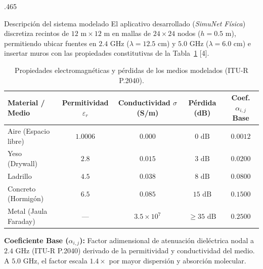 \documentclass[final]{beamer}
\begin{document}
\begin{frame}[t]
\begin{columns}[t]
\begin{column}{.465\paperwidth}
				\begin{block}{Descripción del sistema modelado}
					El aplicativo desarrollado (\textit{SimuNet Física}) discretiza recintos de \(12\text{ m} \times 12\text{ m}\) en mallas de \(24 \times 24\) nodos (\(h = 0.5\text{ m}\)), permitiendo ubicar fuentes en \(2.4\text{ GHz}\) (\(\lambda = 12.5\text{ cm}\)) y \(5.0\text{ GHz}\) (\(\lambda = 6.0\text{ cm}\)) e insertar muros con las propiedades constitutivas de la Tabla~\ref{tab:materiales} [4].
					
					\begin{table}
						\centering
						\caption{Propiedades electromagnéticas y pérdidas de los medios modelados (ITU-R P.2040).}
						\label{tab:materiales}
						\fontsize{20}{26}\selectfont
						\begin{tabular}{|l|c|c|c|c|}
							\hline
							\rowcolor{azulMarino!20}
							\textbf{Material / Medio} & \textbf{Permitividad \(\varepsilon_r\)} & \textbf{Conductividad \(\sigma\) (S/m)} & \textbf{Pérdida (dB)} & \textbf{Coef. \(\alpha_{i,j}\) Base} \\
							\hline
							Aire (Espacio libre) & \(1.0006\) & \(0.000\) & \(0\text{ dB}\) & \(0.0012\) \\
							\hline
							Yeso (Drywall) & \(2.8\) & \(0.015\) & \(3\text{ dB}\) & \(0.0200\) \\
							\hline
							Ladrillo & \(4.5\) & \(0.038\) & \(8\text{ dB}\) & \(0.0800\) \\
							\hline
							Concreto (Hormigón) & \(6.5\) & \(0.085\) & \(15\text{ dB}\) & \(0.1500\) \\
							\hline
							Metal (Jaula Faraday) & — & \(3.5 \times 10^7\) & \(\ge 35\text{ dB}\) & \(0.2500\) \\
							\hline
						\end{tabular}
					\end{table}
					
					\vspace{0.15cm}
					\textbf{Coeficiente Base (\(\alpha_{i,j}\)):} Factor adimensional de atenuación dieléctrica nodal a \(2.4\text{ GHz}\) (ITU-R P.2040) derivado de la permitividad y conductividad del medio. A \(5.0\text{ GHz}\), el factor escala \(1.4\times\) por mayor dispersión y absorción molecular.
				\end{block}
				

\end{column}
\end{columns}
\end{frame}
\end{document}

